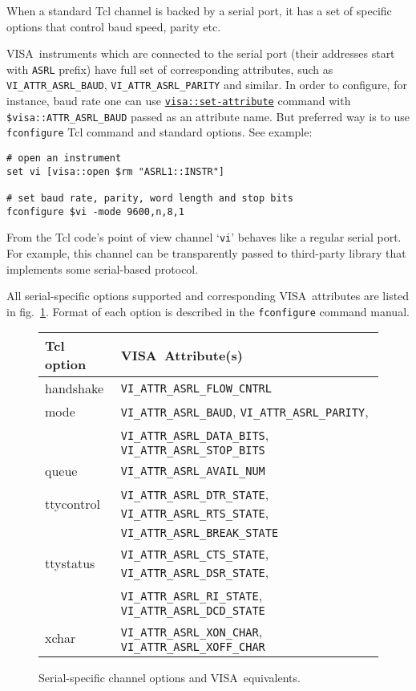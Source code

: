 \documentclass[12pt, a4paper]{report}
\newcommand{\VISA}{\mbox{VISA }}
\newcommand{\COMMANDREF}[1]{{\tt \hyperref[#1]{#1}}}
\newcommand{\TCLCOMMANDREF}[1]{{\tt \mbox{#1}}\index{#1}}
\begin{document}
When a standard Tcl channel is backed by a serial port, it has a set of specific options that control baud speed, parity etc.

\VISA instruments which are connected to the serial port (their addresses start with {\tt ASRL} prefix) have full set of corresponding attributes, such as {\tt VI\_ATTR\_ASRL\_BAUD}, {\tt VI\_ATTR\_ASRL\_PARITY} and similar. In order to configure, for instance, baud rate one can use \COMMANDREF{visa::set-attribute} command with {\tt \$visa::ATTR\_ASRL\_BAUD} passed as an attribute name. But preferred way is to use \TCLCOMMANDREF{fconfigure} Tcl command and standard options. See example:

\begin{verbatim} 
# open an instrument
set vi [visa::open $rm "ASRL1::INSTR"]

# set baud rate, parity, word length and stop bits
fconfigure $vi -mode 9600,n,8,1
\end{verbatim}

From the Tcl code's point of view channel `{\tt vi}' behaves like a regular serial port. For example, this channel can be transparently passed to third-party library that implements some serial-based protocol.

All serial-specific options supported and corresponding \VISA attributes are listed in fig.~\ref{tabSerialOptions}. Format of each option is described in the {\tt fconfigure} command manual.

\begin{figure}
\caption{Serial-specific channel options and \VISA equivalents.}
\label{tabSerialOptions}
\medskip
\begin{tabular}{ll}
Tcl option & \VISA Attribute(s) \\
\hline
handshake & {\tt VI\_ATTR\_ASRL\_FLOW\_CNTRL} \\
mode & {\tt VI\_ATTR\_ASRL\_BAUD}, {\tt VI\_ATTR\_ASRL\_PARITY}, \\
& {\tt VI\_ATTR\_ASRL\_DATA\_BITS}, {\tt VI\_ATTR\_ASRL\_STOP\_BITS} \\
queue & {\tt VI\_ATTR\_ASRL\_AVAIL\_NUM} \\
ttycontrol & {\tt VI\_ATTR\_ASRL\_DTR\_STATE}, {\tt VI\_ATTR\_ASRL\_RTS\_STATE}, \\
& {\tt VI\_ATTR\_ASRL\_BREAK\_STATE} \\
ttystatus & {\tt VI\_ATTR\_ASRL\_CTS\_STATE}, {\tt VI\_ATTR\_ASRL\_DSR\_STATE}, \\
& {\tt VI\_ATTR\_ASRL\_RI\_STATE}, {\tt VI\_ATTR\_ASRL\_DCD\_STATE} \\
xchar & {\tt VI\_ATTR\_ASRL\_XON\_CHAR}, {\tt VI\_ATTR\_ASRL\_XOFF\_CHAR} \\
\end{tabular}
\end{figure}
\end{document}
